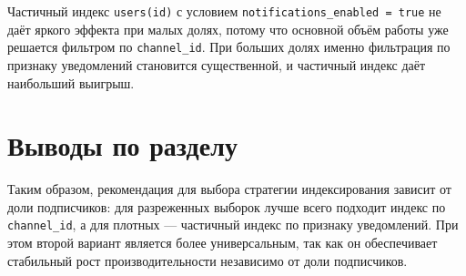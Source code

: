 Частичный индекс \texttt{users(id)} с условием \texttt{notifications\_enabled = true} не даёт яркого эффекта при малых долях, потому что основной объём работы уже решается фильтром по \texttt{channel\_id}.
При больших долях именно фильтрация по признаку уведомлений становится существенной, и частичный индекс даёт наибольший выигрыш.


\section*{Выводы по разделу}

Таким образом, рекомендация для выбора стратегии индексирования зависит от доли подписчиков: для разреженных выборок лучше всего подходит индекс по \texttt{channel\_id}, а для плотных --- частичный индекс по признаку уведомлений.
При этом второй вариант является более универсальным, так как он обеспечивает стабильный рост производительности независимо от доли подписчиков.
\clearpage

